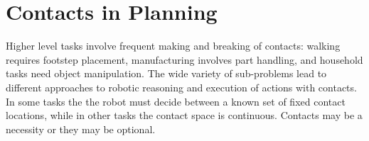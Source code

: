 \documentclass[../thesis.tex]{subfiles}
\begin{document}








\section{Contacts in Planning}

Higher level tasks involve frequent making and breaking of contacts:
walking requires footstep placement, manufacturing involves part handling, and household tasks need object manipulation.
The wide variety of sub-problems lead to different approaches to robotic reasoning and execution of actions with contacts.
In some tasks the the robot must decide between a known set of fixed contact locations, while in other tasks the contact space is continuous.
Contacts may be a necessity or they may be optional.
\end{document}
